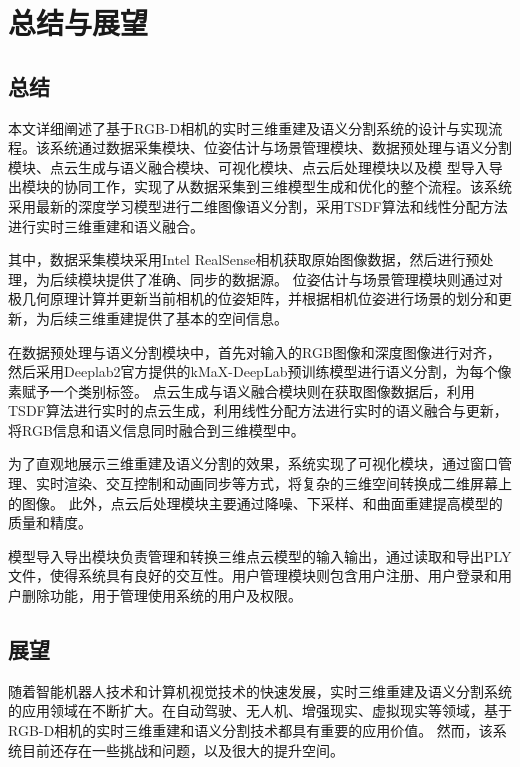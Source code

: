 
\chapter{总结与展望}

\section{总结}

\par 本文详细阐述了基于RGB-D相机的实时三维重建及语义分割系统的设计与实现流程。该系统通过数据采集模块、位姿估计与场景管理模块、数据预处理与语义分割模块、点云生成与语义融合模块、可视化模块、点云后处理模块以及模
型导入导出模块的协同工作，实现了从数据采集到三维模型生成和优化的整个流程。该系统采用最新的深度学习模型进行二维图像语义分割，采用TSDF算法和线性分配方法进行实时三维重建和语义融合。

\par 其中，数据采集模块采用Intel RealSense相机获取原始图像数据，然后进行预处理，为后续模块提供了准确、同步的数据源。
位姿估计与场景管理模块则通过对极几何原理计算并更新当前相机的位姿矩阵，并根据相机位姿进行场景的划分和更新，为后续三维重建提供了基本的空间信息。

\par 在数据预处理与语义分割模块中，首先对输入的RGB图像和深度图像进行对齐，然后采用Deeplab2官方提供的kMaX-DeepLab预训练模型进行语义分割，为每个像素赋予一个类别标签。
点云生成与语义融合模块则在获取图像数据后，利用TSDF算法进行实时的点云生成，利用线性分配方法进行实时的语义融合与更新，将RGB信息和语义信息同时融合到三维模型中。

\par 为了直观地展示三维重建及语义分割的效果，系统实现了可视化模块，通过窗口管理、实时渲染、交互控制和动画同步等方式，将复杂的三维空间转换成二维屏幕上的图像。
此外，点云后处理模块主要通过降噪、下采样、和曲面重建提高模型的质量和精度。

\par 模型导入导出模块负责管理和转换三维点云模型的输入输出，通过读取和导出PLY文件，使得系统具有良好的交互性。用户管理模块则包含用户注册、用户登录和用户删除功能，用于管理使用系统的用户及权限。

\section{展望}

\par 随着智能机器人技术和计算机视觉技术的快速发展，实时三维重建及语义分割系统的应用领域在不断扩大。在自动驾驶、无人机、增强现实、虚拟现实等领域，基于RGB-D相机的实时三维重建和语义分割技术都具有重要的应用价值。
然而，该系统目前还存在一些挑战和问题，以及很大的提升空间。

